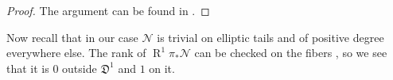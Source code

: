 \documentclass[11pt]{amsart}
\newcommand{\OO}{\mathcal O}
\renewcommand{\to}{\rightarrow}
\newcommand{\R}{\operatorname{R}}
\theoremstyle{plain}
\theoremstyle{definition}
\begin{document}
\begin{proof}
The argument can be found in \cite[Lemmma~3.7.2.2]{RSPW}.

\end{proof}
Now recall that in our case $\mathcal N$ is trivial on elliptic tails and of positive degree everywhere else. The rank of $\R^1\pi_*\mathcal N$ can be checked on the fibers \cite[Theorem III.12.11]{HAR}, so we see that it is $0$ outside $\mathfrak D^1$ and $1$ on it.
\end{document}
